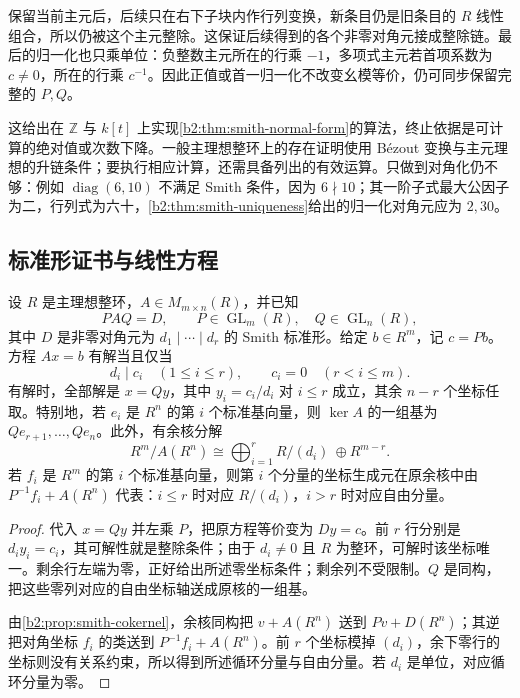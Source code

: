 \ProseParagraphBreak
保留当前主元后，后续只在右下子块内作行列变换，新条目仍是旧条目的 \(R\) 线性组合，所以仍被这个主元整除。这保证后续得到的各个非零对角元接成整除链。最后的归一化也只乘单位：负整数主元所在的行乘 \(-1\)，多项式主元若首项系数为 \(c\ne0\)，所在的行乘 \(c^{-1}\)。因此正值或首一归一化不改变幺模等价，仍可同步保留完整的 \(P,Q\)。

\ProseParagraphBreak
这给出在 \(\mathbb Z\) 与 \(k[t]\) 上实现\cref{b2:thm:smith-normal-form}的算法，终止依据是可计算的绝对值或次数下降。一般主理想整环上的存在证明使用 Bézout 变换与主元理想的升链条件；要执行相应计算，还需具备列出的有效运算。只做到对角化仍不够：例如 \(\operatorname{diag}(6,10)\) 不满足 Smith 条件，因为 \(6\nmid10\)；其一阶子式最大公因子为二，行列式为六十，\cref{b2:thm:smith-uniqueness}给出的归一化对角元应为 \(2,30\)。

\subsection{标准形证书与线性方程}
\label{b2:subsec:A01:03}

\begin{proposition}\label{b2:prop:A-smith-solving}
	设 \(R\) 是主理想整环，\(A\in M_{m\times n}(R)\)，并已知
	\[
		PAQ=D,\qquad P\in\operatorname{GL}_m(R),\quad Q\in\operatorname{GL}_n(R),
	\]
	其中 \(D\) 是非零对角元为 \(d_1\mid\cdots\mid d_r\) 的 Smith 标准形。给定 \(b\in R^m\)，记 \(c=Pb\)。方程 \(Ax=b\) 有解当且仅当
	\[
		d_i\mid c_i\quad(1\le i\le r),\qquad c_i=0\quad(r<i\le m).
	\]
	有解时，全部解是 \(x=Qy\)，其中 \(y_i=c_i/d_i\) 对 \(i\le r\) 成立，其余 \(n-r\) 个坐标任取。特别地，若 \(e_i\) 是 \(R^n\) 的第 \(i\) 个标准基向量，则 \(\ker A\) 的一组基为 \(Qe_{r+1},\ldots,Qe_n\)。此外，有余核分解
	\[
		R^m/A(R^n)\cong\bigoplus_{i=1}^r R/(d_i)\ \oplus R^{m-r}.
	\]
	若 \(f_i\) 是 \(R^m\) 的第 \(i\) 个标准基向量，则第 \(i\) 个分量的坐标生成元在原余核中由 \(P^{-1}f_i+A(R^n)\) 代表：\(i\le r\) 时对应 \(R/(d_i)\)，\(i>r\) 时对应自由分量。
\end{proposition}
\begin{proof}
	代入 \(x=Qy\) 并左乘 \(P\)，把原方程等价变为 \(Dy=c\)。前 \(r\) 行分别是 \(d_i y_i=c_i\)，其可解性就是整除条件；由于 \(d_i\ne0\) 且 \(R\) 为整环，可解时该坐标唯一。剩余行左端为零，正好给出所述零坐标条件；剩余列不受限制。\(Q\) 是同构，把这些零列对应的自由坐标轴送成原核的一组基。

	由\cref{b2:prop:smith-cokernel}，余核同构把 \(v+A(R^n)\) 送到 \(Pv+D(R^n)\)；其逆把对角坐标 \(f_i\) 的类送到 \(P^{-1}f_i+A(R^n)\)。前 \(r\) 个坐标模掉 \((d_i)\)，余下零行的坐标则没有关系约束，所以得到所述循环分量与自由分量。若 \(d_i\) 是单位，对应循环分量为零。
\end{proof}

